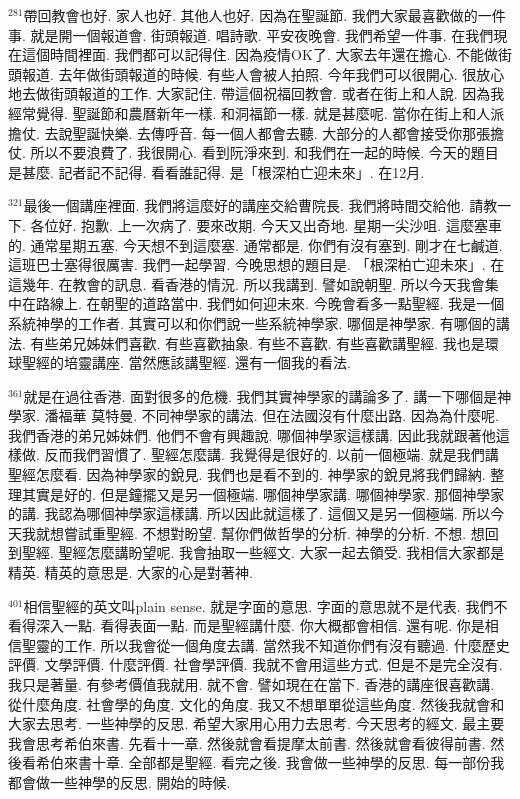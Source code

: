 \documentclass{book}
\begin{document}
$^{281}$帶回教會也好.
家人也好.
其他人也好.
因為在聖誕節.
我們大家最喜歡做的一件事.
就是開一個報道會.
街頭報道.
唱詩歌.
平安夜晚會.
我們希望一件事.
在我們現在這個時間裡面.
我們都可以記得住.
因為疫情OK了.
大家去年還在擔心.
不能做街頭報道.
去年做街頭報道的時候.
有些人會被人拍照.
今年我們可以很開心.
很放心地去做街頭報道的工作.
大家記住.
帶這個祝福回教會.
或者在街上和人說.
因為我經常覺得.
聖誕節和農曆新年一樣.
和洞福節一樣.
就是甚麼呢.
當你在街上和人派擔仗.
去說聖誕快樂.
去傳呼音.
每一個人都會去聽.
大部分的人都會接受你那張擔仗.
所以不要浪費了.
我很開心.
看到阮淨來到.
和我們在一起的時候.
今天的題目是甚麼.
記者記不記得.
看看誰記得.
是「根深柏亡迎未來」.
在12月.

$^{321}$最後一個講座裡面.
我們將這麼好的講座交給曹院長.
我們將時間交給他.
請教一下.
各位好.
抱歉.
上一次病了.
要來改期.
今天又出奇地.
星期一尖沙咀.
這麼塞車的.
通常星期五塞.
今天想不到這麼塞.
通常都是.
你們有沒有塞到.
剛才在七鹹道.
這班巴士塞得很厲害.
我們一起學習.
今晚思想的題目是.
「根深柏亡迎未來」.
在這幾年.
在教會的訊息.
看香港的情況.
所以我講到.
譬如說朝聖.
所以今天我會集中在路線上.
在朝聖的道路當中.
我們如何迎未來.
今晚會看多一點聖經.
我是一個系統神學的工作者.
其實可以和你們說一些系統神學家.
哪個是神學家.
有哪個的講法.
有些弟兄姊妹們喜歡.
有些喜歡抽象.
有些不喜歡.
有些喜歡講聖經.
我也是環球聖經的培靈講座.
當然應該講聖經.
還有一個我的看法.

$^{361}$就是在過往香港.
面對很多的危機.
我們其實神學家的講論多了.
講一下哪個是神學家.
潘福華 莫特曼.
不同神學家的講法.
但在法國沒有什麼出路.
因為為什麼呢.
我們香港的弟兄姊妹們.
他們不會有興趣說.
哪個神學家這樣講.
因此我就跟著他這樣做.
反而我們習慣了.
聖經怎麼講.
我覺得是很好的.
以前一個極端.
就是我們講聖經怎麼看.
因為神學家的銳見.
我們也是看不到的.
神學家的銳見將我們歸納.
整理其實是好的.
但是鐘擺又是另一個極端.
哪個神學家講.
哪個神學家.
那個神學家的講.
我認為哪個神學家這樣講.
所以因此就這樣了.
這個又是另一個極端.
所以今天我就想嘗試重聖經.
不想對盼望.
幫你們做哲學的分析.
神學的分析.
不想.
想回到聖經.
聖經怎麼講盼望呢.
我會抽取一些經文.
大家一起去領受.
我相信大家都是精英.
精英的意思是.
大家的心是對著神.

$^{401}$相信聖經的英文叫plain sense.
就是字面的意思.
字面的意思就不是代表.
我們不看得深入一點.
看得表面一點.
而是聖經講什麼.
你大概都會相信.
還有呢.
你是相信聖靈的工作.
所以我會從一個角度去講.
當然我不知道你們有沒有聽過.
什麼歷史評價.
文學評價.
什麼評價.
社會學評價.
我就不會用這些方式.
但是不是完全沒有.
我只是著量.
有參考價值我就用.
就不會.
譬如現在在當下.
香港的講座很喜歡講.
從什麼角度.
社會學的角度.
文化的角度.
我又不想單單從這些角度.
然後我就會和大家去思考.
一些神學的反思.
希望大家用心用力去思考.
今天思考的經文.
最主要我會思考希伯來書.
先看十一章.
然後就會看提摩太前書.
然後就會看彼得前書.
然後看希伯來書十章.
全部都是聖經.
看完之後.
我會做一些神學的反思.
每一部份我都會做一些神學的反思.
開始的時候.
\end{document}
